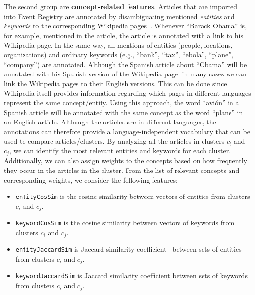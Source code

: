 The second group are {\bf concept-related features}. Articles that are imported into Event Registry 
are annotated by disambiguating mentioned \emph{entities} and \emph{keywords} to the corresponding 
Wikipedia pages~\cite{zhang2014}. Whenever ``Barack Obama'' is, for example, mentioned in the article, 
the article is annotated with a link to his Wikipedia page. In the same way, all mentions of 
entities (people, locations, organizations) and ordinary keywords (e.g., ``bank'', ``tax'', ``ebola'', ``plane'', ``company'') 
are annotated. Although the Spanish article about ``Obama'' will be annotated with his Spanish 
version of the Wikipedia page, in many cases we can link the Wikipedia pages to their English 
versions. This can be done since Wikipedia itself provides information regarding which pages 
in different languages represent the same concept/entity. Using this approach, the word ``avi\'on'' 
in a Spanish article will be annotated with the same concept as the word ``plane'' in an English article. 
Although the articles are in different languages, the annotations can therefore provide a language-independent 
vocabulary that can be used to compare articles/clusters. By analyzing all the articles in 
clusters $c_i$ and $c_j$, we can identify the most relevant entities and keywords for each cluster. 
Additionally, we can also assign weights to the concepts based on how frequently they occur in the 
articles in the cluster. From the list of relevant concepts and corresponding weights, we consider 
the following features:

\begin{itemize}
\item \texttt{entityCosSim} is the cosine similarity between vectors of entities from clusters $c_i$ and $c_j$.
\item \texttt{keywordCosSim} is the cosine similarity between vectors of keywords from clusters $c_i$ and $c_j$.
\item \texttt{entityJaccardSim} is  Jaccard similarity coefficient~\cite{levandowsky1971} between sets of entities from clusters $c_i$ and $c_j$.
\item \texttt{keywordJaccardSim} is  Jaccard similarity coefficient between sets of keywords from clusters $c_i$ and $c_j$.
\end{itemize}

